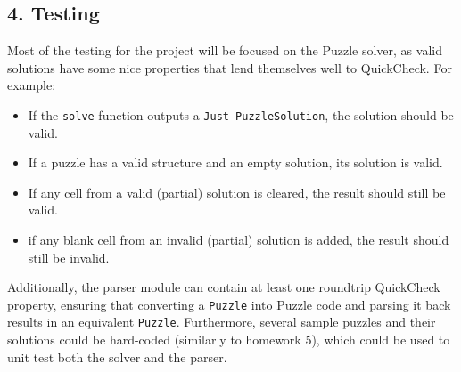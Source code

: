 \documentclass[
]{article}
\begin{document}
	\hypertarget{testing}{%
		\subsection{4. Testing}\label{testing}}
	
	Most of the testing for the project will be focused on the Puzzle solver, as valid solutions have some nice properties that lend themselves well to QuickCheck. For example: \begin{itemize}
		\item If the \texttt{solve} function outputs a \texttt{Just PuzzleSolution}, the solution should be valid.
		\item If a puzzle has a valid structure and an empty solution, its solution is valid.
		\item If any cell from a valid (partial) solution is cleared, the result should still be valid.
		\item if any blank cell from an invalid (partial) solution is added, the result should still be invalid.
	\end{itemize}
	Additionally, the parser module can contain at least one roundtrip QuickCheck property, ensuring that converting a \texttt{Puzzle} into Puzzle code and parsing it back results in an equivalent \texttt{Puzzle}.
	Furthermore, several sample puzzles and their solutions could be hard-coded (similarly to homework 5), which could be used to unit test both the solver and the parser.
	
\end{document}
